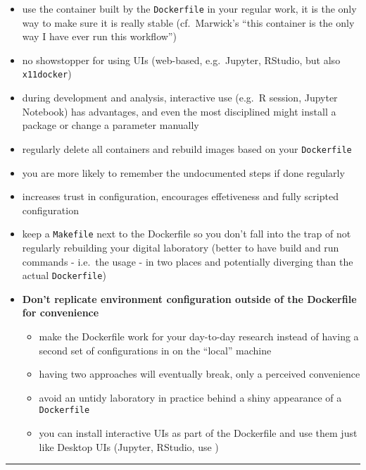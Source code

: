 \documentclass[10pt,letterpaper]{article}
\providecommand{\tightlist}{%
  \setlength{\itemsep}{0pt}\setlength{\parskip}{0pt}}
\begin{document}
\begin{itemize}
\tightlist
\item
  use the container built by the \texttt{Dockerfile} in your regular
  work, it is the only way to make sure it is really stable
  (cf.~Marwick's ``this container is the only way I have ever run this
  workflow'')
\item
  no showstopper for using UIs (web-based, e.g.~Jupyter, RStudio, but
  also \texttt{x11docker})
\item
  during development and analysis, interactive use (e.g.~R session,
  Jupyter Notebook) has advantages, and even the most disciplined might
  install a package or change a parameter manually
\item
  regularly delete all containers and rebuild images based on your
  \texttt{Dockerfile}
\item
  you are more likely to remember the undocumented steps if done
  regularly
\item
  increases trust in configuration, encourages effetiveness and fully
  scripted configuration
\item
  keep a \texttt{Makefile} next to the Dockerfile so you don't fall into
  the trap of not regularly rebuilding your digital laboratory (better
  to have build and run commands - i.e.~the usage - in two places and
  potentially diverging than the actual \texttt{Dockerfile})
\item
  \textbf{Don't replicate environment configuration outside of the
  Dockerfile for convenience}

  \begin{itemize}
  \tightlist
  \item
    make the Dockerfile work for your day-to-day research instead of
    having a second set of configurations in on the ``local'' machine
  \item
    having two approaches will eventually break, only a perceived
    convenience
  \item
    avoid an untidy laboratory in practice behind a shiny appearance of
    a \texttt{Dockerfile}
  \item
    you can install interactive UIs as part of the Dockerfile and use
    them just like Desktop UIs (Jupyter, RStudio, use )
  \end{itemize}
\end{itemize}

\begin{center}\rule{0.5\linewidth}{\linethickness}\end{center}
\end{document}
